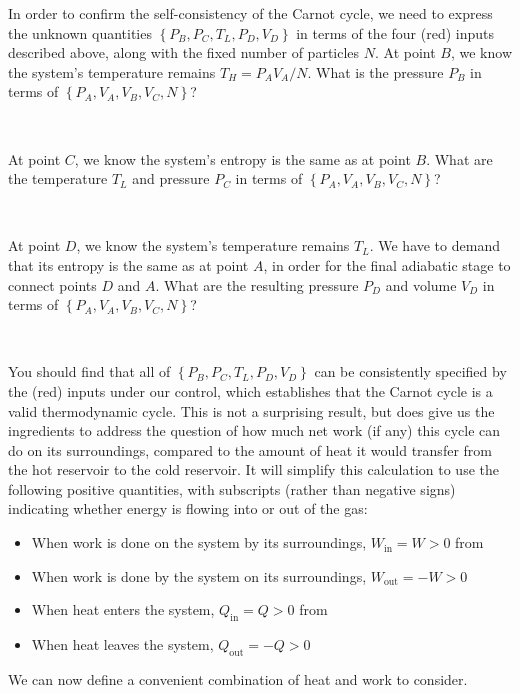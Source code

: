 In order to confirm the self-consistency of the Carnot cycle, we need to express the unknown quantities $\left\{P_B, P_C, T_L, P_D, V_D\right\}$ in terms of the four (red) inputs described above, along with the fixed number of particles $N$.
At point $B$, we know the system's temperature remains $T_H = P_A V_A / N$.
What is the pressure $P_B$ in terms of $\left\{P_A, V_A, V_B, V_C, N\right\}$?
\begin{mdframed}
  \ \\[50 pt]
\end{mdframed}

At point $C$, we know the system's entropy is the same as at point $B$.
What are the temperature $T_L$ and pressure $P_C$ in terms of $\left\{P_A, V_A, V_B, V_C, N\right\}$?
\begin{mdframed}
  \ \\[100 pt]
\end{mdframed}

At point $D$, we know the system's temperature remains $T_L$.
We have to demand that its entropy is the same as at point $A$, in order for the final adiabatic stage to connect points $D$ and $A$.
What are the resulting pressure $P_D$ and volume $V_D$ in terms of $\left\{P_A, V_A, V_B, V_C, N\right\}$?
\begin{mdframed}
  \ \\[100 pt]
\end{mdframed}

You should find that all of $\left\{P_B, P_C, T_L, P_D, V_D\right\}$ can be consistently specified by the (red) inputs under our control, which establishes that the Carnot cycle is a valid thermodynamic cycle.
This is not a surprising result, but does give us the ingredients to address the question of how much net work (if any) this cycle can do on its surroundings, compared to the amount of heat it would transfer from the hot reservoir to the cold reservoir.
It will simplify this calculation to use the following positive quantities, with subscripts (rather than negative signs) indicating whether energy is flowing into or out of the gas: \\[-24 pt]
\begin{itemize}
  \item When work is done on the system by its surroundings, $W_{\text{in}} = W > 0$ from 
  \item When work is done by the system on its surroundings, $W_{\text{out}} = -W > 0$
  \item When heat enters the system, $Q_{\text{in}} = Q > 0$ from 
  \item When heat leaves the system, $Q_{\text{out}} = -Q > 0$
\end{itemize}
We can now define a convenient combination of heat and work to consider.

